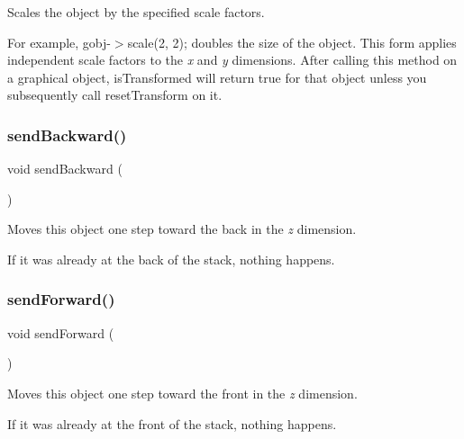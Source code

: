 Scales the object by the specified scale factors. 

For example, {\ttfamily gobj-\/$>$scale(2, 2);} doubles the size of the object. This form applies independent scale factors to the {\itshape x} and {\itshape y} dimensions. After calling this method on a graphical object, {\ttfamily is\+Transformed} will return {\ttfamily true} for that object unless you subsequently call {\ttfamily reset\+Transform} on it. \mbox{\label{classGObject_ab6747f40313c531c2db32edb5b63b9b7}} 
\subsubsection{\texorpdfstring{send\+Backward()}{sendBackward()}}
{\footnotesize\ttfamily void send\+Backward (\begin{DoxyParamCaption}{ }\end{DoxyParamCaption})\hspace{0.3cm}{\ttfamily [inherited]}}



Moves this object one step toward the back in the {\itshape z} dimension. 

If it was already at the back of the stack, nothing happens. \mbox{\label{classGObject_a710b3e449c9facba7847c91ab170d281}} 
\subsubsection{\texorpdfstring{send\+Forward()}{sendForward()}}
{\footnotesize\ttfamily void send\+Forward (\begin{DoxyParamCaption}{ }\end{DoxyParamCaption})\hspace{0.3cm}{\ttfamily [inherited]}}



Moves this object one step toward the front in the {\itshape z} dimension. 

If it was already at the front of the stack, nothing happens. \mbox{\label{classGObject_a0f7f1efbb7fd46dde2867c4ad0330896}} 
